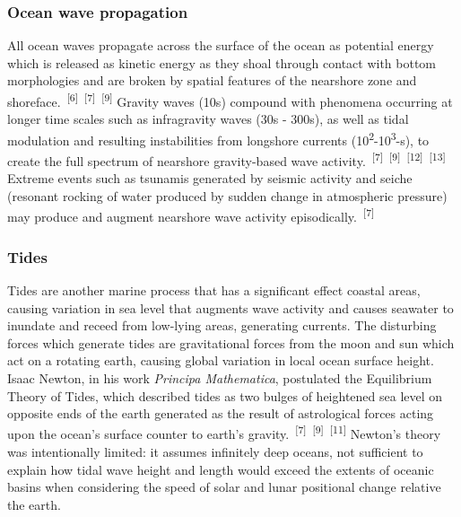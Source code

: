 \documentclass{article}
\begin{document}
\subsubsection{Ocean wave propagation}


\par{All ocean waves propagate across the surface of the ocean as potential energy which is released as kinetic energy as they shoal through contact with bottom morphologies and are broken by spatial features of the nearshore zone and shoreface.~\textsuperscript{[6]}~\textsuperscript{[7]}~\textsuperscript{[9]} Gravity waves (10s) compound with phenomena occurring at longer time scales such as infragravity waves (30s - 300s), as well as tidal modulation and resulting instabilities from longshore currents (10\textsuperscript{2}-10\textsuperscript{3}-s), to create the full spectrum of nearshore gravity-based wave activity.~\textsuperscript{[7]}~\textsuperscript{[9]}~\textsuperscript{[12]}~\textsuperscript{[13]} Extreme events such as tsunamis generated by seismic activity and seiche (resonant rocking of water produced by sudden change in atmospheric pressure) may produce and augment nearshore wave activity episodically.~\textsuperscript{[7]}}


\subsubsection{Tides}

\par{Tides are another marine process that has a significant effect coastal areas, causing variation in sea level that augments wave activity and causes seawater to inundate and receed from low-lying areas, generating currents. The disturbing forces which generate tides are gravitational forces from the moon and sun which act on a rotating earth, causing global variation in local ocean surface height. Isaac Newton, in his work \textit{Principa Mathematica}, postulated the Equilibrium Theory of Tides, which described tides as two bulges of heightened sea level on opposite ends of the earth generated as the result of astrological forces acting upon the ocean's surface counter to earth's gravity.~\textsuperscript{[7]}~\textsuperscript{[9]}~\textsuperscript{[11]} Newton's theory was intentionally limited: it assumes infinitely deep oceans, not sufficient to explain how tidal wave height and length would exceed the extents of oceanic basins when considering the speed of solar and lunar positional change relative the earth.}
\end{document}
